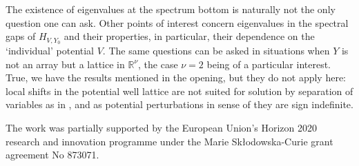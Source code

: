 \documentclass{article}
\numberwithin{equation}{section}
\theoremstyle{definition}
\newcommand{\R}{\mathbb{R}}
\begin{document}
The existence of eigenvalues at the spectrum bottom is naturally not the only question one can ask. Other points of interest concern eigenvalues in the spectral gaps of $H_{V,Y_0}$ and their properties, in particular, their dependence on the `individual' potential $V$. The same questions can be asked in situations when $Y$ is not an array but a lattice in $\R^\nu$, the case $\nu=2$ being of a particular interest. True, we have the results mentioned in the opening, but they do not apply here: local shifts in the potential well lattice are not suited for solution by separation of variables as in \cite{FK98}, and as potential perturbations in sense of \cite{ADH89} they are sign indefinite.


\begin{funding}
The work was partially supported by the European Union's Horizon 2020 research and innovation programme under the Marie Sk\l odowska-Curie grant agreement No 873071.
\end{funding}
\end{document}
